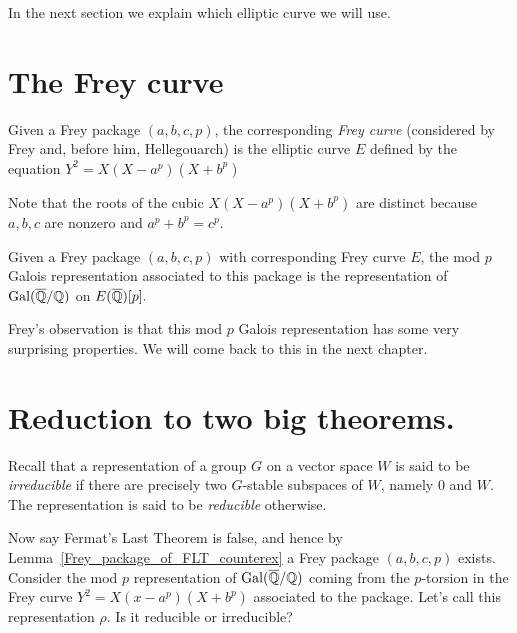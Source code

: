In the next section we explain which elliptic curve we will use.

\section{The Frey curve}

\begin{definition}[Frey]\label{Frey_curve}
  Given a Frey package $(a,b,c,p)$, the corresponding \emph{Frey curve} (considered by Frey and, before him, Hellegouarch) is the elliptic curve $E$ defined by the equation $Y^2=X(X-a^p)(X+b^p)$\end{definition}

Note that  the roots of the cubic $X(X-a^p)(X+b^p)$ are distinct because $a,b,c$ are nonzero and $a^p+b^p=c^p$.

\begin{definition}\label{Frey_mod_p_Galois_representation} Given a Frey package $(a,b,c,p)$ with corresponding Frey curve $E$, the mod $p$ Galois representation associated to this package is the representation of $\operatorname{Gal}(\overline{\mathbb{Q}}/\mathbb{Q})$ on $E(\overline{\mathbb{Q}})[p].$\end{definition}

Frey's observation is that this mod $p$ Galois representation has some very surprising properties. We will come back to this in the next chapter.

\section{Reduction to two big theorems.}
  
Recall that a representation of a group $G$ on a vector space $W$ is said to be \emph{irreducible} if there are precisely two $G$-stable subspaces of $W$, namely $0$ and $W$. The representation is said to be \emph{reducible} otherwise.

Now say Fermat's Last Theorem is false, and hence by Lemma~\ref{Frey_package_of_FLT_counterex} a Frey package $(a,b,c,p)$ exists.  Consider the mod $p$ representation of $\operatorname{Gal}(\overline{\mathbb{Q}}/\mathbb{Q})$ coming from the $p$-torsion in the Frey curve $Y^2=X(x-a^p)(X+b^p)$ associated to the package. Let's call this representation $\rho$. Is it reducible or irreducible?


